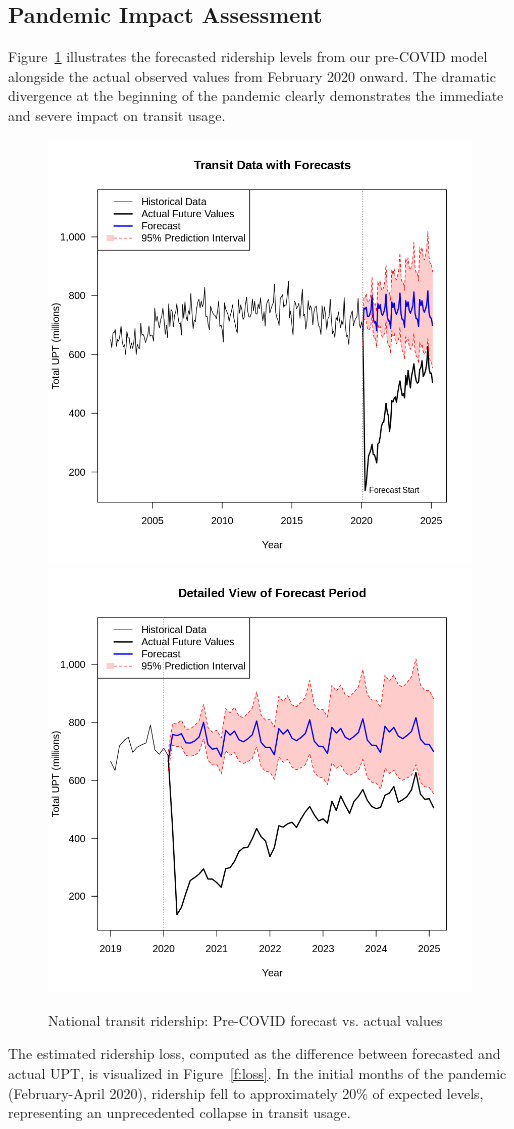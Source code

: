 \documentclass[11pt]{article}
\begin{document}
\subsection{Pandemic Impact Assessment}

Figure~\ref{f:forecast} illustrates the forecasted ridership levels from our pre-COVID model alongside the actual observed values from February 2020 onward. The dramatic divergence at the beginning of the pandemic clearly demonstrates the immediate and severe impact on transit usage.

\begin{figure}[!ht]
\centering
\includegraphics[width=0.485\linewidth]{pre_forecast.png}
\includegraphics[width=0.485\linewidth]{pre_forecast_close.png}
\caption{National transit ridership: Pre-COVID forecast vs. actual values}
\label{f:forecast}
\end{figure}

The estimated ridership loss, computed as the difference between forecasted and actual UPT, is visualized in Figure~\ref{f:loss}. In the initial months of the pandemic (February-April 2020), ridership fell to approximately 20\% of expected levels, representing an unprecedented collapse in transit usage. 
\end{document}

